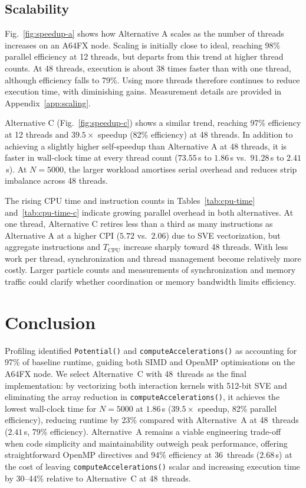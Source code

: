 \documentclass[conference]{IEEEtran}
\begin{document}
\subsection{Scalability}
Fig.~\ref{fig:speedup-a} shows how Alternative A scales as the number
of threads increases on an A64FX node. Scaling is initially close to
ideal, reaching 98\% parallel efficiency at 12 threads, but departs
from this trend at higher thread counts. At 48 threads, execution is
about 38 times faster than with one thread, although efficiency falls
to 79\%. Using more threads therefore continues to reduce execution
time, with diminishing gains.
Measurement details are provided in Appendix~\ref{app:scaling}.

Alternative C (Fig.~\ref{fig:speedup-c}) shows a similar trend,
reaching 97\% efficiency at 12 threads and $39.5\times$ speedup (82\%
efficiency) at 48 threads. In addition to achieving a slightly higher
self-speedup than Alternative A at 48 threads, it is faster in
wall-clock time at every thread count ($73.55$\,s to $1.86$\,s vs.\
$91.28$\,s to $2.41$\,s). At $N=5000$, the larger workload amortises
serial overhead and reduces strip imbalance across 48 threads.

The rising CPU time and instruction counts in
Tables~\ref{tab:cpu-time} and~\ref{tab:cpu-time-c} indicate growing
parallel overhead in both alternatives. At one thread, Alternative C
retires less than a third as many instructions as Alternative A at a
higher CPI ($5.72$ vs.\ $2.06$) due to SVE vectorization, but aggregate
instructions and $T_\text{CPU}$ increase sharply toward 48 threads.
With less work per thread, synchronization and thread management become
relatively more costly. Larger particle counts and measurements of
synchronization and memory traffic could clarify whether coordination
or memory bandwidth limits efficiency.

\section{Conclusion}
Profiling identified \texttt{Potential()} and \texttt{computeAccelerations()}
as accounting for 97\% of baseline runtime, guiding both SIMD and OpenMP
optimisations on the A64FX node. We select Alternative~C with 48~threads
as the final implementation: by vectorizing both interaction kernels with
512-bit SVE and eliminating the array reduction in
\texttt{computeAccelerations()}, it achieves the lowest wall-clock time
for $N=5000$ at $1.86$\,s ($39.5\times$ speedup, 82\% parallel
efficiency), reducing runtime by 23\% compared with Alternative~A at
48~threads ($2.41$\,s, 79\% efficiency). Alternative~A remains a viable
engineering trade-off when code simplicity and maintainability outweigh
peak performance, offering straightforward OpenMP directives and 94\%
efficiency at 36~threads ($2.68$\,s) at the cost of leaving
\texttt{computeAccelerations()} scalar and increasing execution time by
30--44\% relative to Alternative~C at 48~threads.
\end{document}
